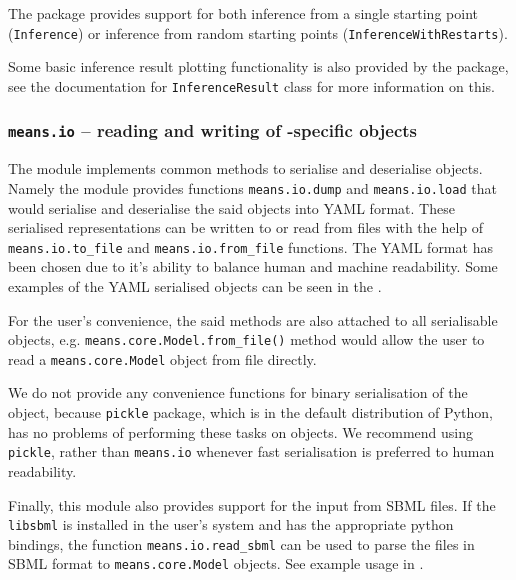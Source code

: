 The package provides support for both inference from a single starting point (\verb"Inference")
or inference from random starting points (\verb"InferenceWithRestarts").

Some basic inference result plotting functionality is also provided by the package, see the documentation for
\verb"InferenceResult" class for more information on this. 

\subsubsection{{\tt means.io} -- reading and writing of \means-specific objects}
The module implements common methods to serialise and deserialise \means objects.
Namely the module provides functions \verb`means.io.dump` and  \verb`means.io.load` that would
serialise and deserialise the said objects into YAML format.
These serialised representations can be written to or read from files with the help of
\verb`means.io.to_file` and \verb`means.io.from_file` functions.
The YAML format has been chosen due to it's ability to balance human and machine readability. 
Some examples of the YAML serialised objects can be seen in the .

For the user's convenience, the said methods are also attached to all serialisable objects,
e.g. \verb`means.core.Model.from_file()` method would allow the user to read a \verb`means.core.Model` object from file directly.

We do not provide any convenience functions for binary serialisation of the object, because \verb`pickle` package,
which is in the default distribution of Python, has no problems of performing these tasks on \means objects. 
We recommend using \verb`pickle`, rather than \verb`means.io` whenever fast serialisation is preferred to human
readability.

Finally, this module also provides support for the input from SBML files.
If the \verb`libsbml` is installed in the user's system and has the appropriate python bindings, the function \verb`means.io.read_sbml` can be used to parse the files in SBML format
to \verb`means.core.Model` objects. See example usage in .

